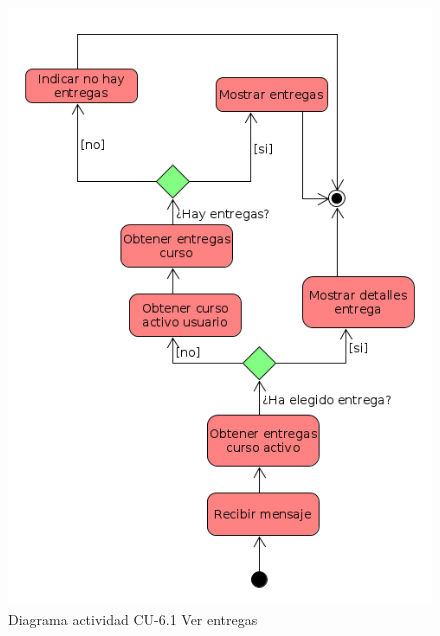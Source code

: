         \begin{figure}[!ht] %
\centering
\includegraphics[scale=0.4]{imagenes/diagramas/actividad/mostrar_entregass.png}  %

\caption{Diagrama actividad CU-6.1 Ver entregas}\label{figura153}
\end{figure}


